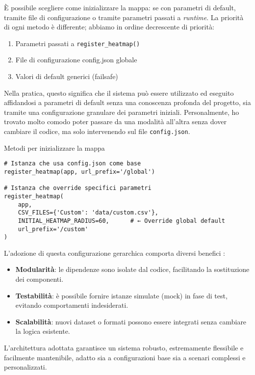 È possibile scegliere come inizializzare la mappa: se con parametri di default, tramite file di configurazione o tramite parametri passati a \textit{runtime}. La priorità di ogni metodo è differente; abbiamo in ordine decrescente di priorità:

\begin{enumerate}
    \item Parametri passati a \texttt{register\_heatmap()}
    \item File di configurazione config.json globale
    \item Valori di default generici (failsafe)
\end{enumerate}
Nella pratica, questo significa che il sistema può essere utilizzato ed eseguito affidandosi a parametri di default senza una conoscenza profonda del progetto, sia tramite una configurazione granulare dei parametri iniziali. Personalmente, ho trovato molto comodo poter passare da una modalità all'altra senza dover cambiare il codice, ma solo intervenendo sul file \texttt{config.json}.

\begin{listing}[H]
\caption{Metodi per inizializzare la mappa}
\label{lst:register_hm}
\begin{verbatim}
# Istanza che usa config.json come base
register_heatmap(app, url_prefix='/global')

# Istanza che override specifici parametri
register_heatmap(
    app, 
    CSV_FILES={'Custom': 'data/custom.csv'},
    INITIAL_HEATMAP_RADIUS=60,      # ← Override global default
    url_prefix='/custom'
)
\end{verbatim}
\end{listing}

L'adozione di questa configurazione gerarchica comporta diversi benefici \cite{dependency-injection-wiki}:

\begin{itemize}
  \item \textbf{Modularità}: le dipendenze sono isolate dal codice, facilitando la sostituzione dei componenti.
  \item \textbf{Testabilità}: è possibile fornire istanze simulate (mock) in fase di test, evitando comportamenti indesiderati.
  \item \textbf{Scalabilità}: nuovi dataset o formati possono essere integrati senza cambiare la logica esistente.
\end{itemize}

L'architettura adottata garantisce un sistema robusto, estremamente flessibile e facilmente mantenibile, adatto sia a configurazioni base sia a scenari complessi e personalizzati.

